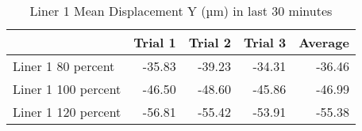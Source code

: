 \begin{table}[htbp]
\centering
\begin{tabular}{lrrrr}
\toprule
  & Trial 1 & Trial 2 & Trial 3 & Average \\
\midrule
 Liner 1 80 percent & -35.83 & -39.23 & -34.31 & -36.46 \\
 Liner 1 100 percent & -46.50 & -48.60 & -45.86 & -46.99 \\
 Liner 1 120 percent & -56.81 & -55.42 & -53.91 & -55.38 \\
\bottomrule
\end{tabular}
\caption{Liner 1 Mean Displacement Y (µm) in last 30 minutes}
\label{fig:liner_1_results_table}
\end{table}